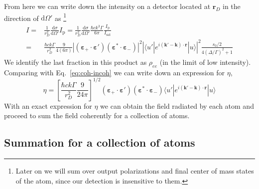 \documentclass[11pt,letter]{article}
\newcommand{\bv}[1]{\ensuremath{\bm{#1}}}
\begin{document}
From here we can write down the intensity on a detector located at $\bv{r}_{D}$
in the direction of $\mathrm{d} \Omega'$ as \footnote{Later on we will sum over
output polarizations and final center of mass states of the atom, since our
detection is insensitive to them.}
\begin{equation}
\begin{split}
I  =& \frac{1}{r_{D}^{2}} \frac{ \mathrm{d} \sigma } { \mathrm{d} \Omega'}
      I_{\mathrm{p}} 
   =  \frac{1}{r_{D}^{2}} \frac{ \mathrm{d} \sigma } { \mathrm{d} \Omega'}
      \frac{\hbar c k^{3}\Gamma}{6 \pi} 
      \frac{ I_{\mathrm{p}}}{I_{\mathrm{sat}}}  \\ 
   =& \frac{\hbar c k \Gamma}{r_{D}^{2}}  
    \frac{9}{4 (6\pi)} 
        |(\bv{\varepsilon}_{+}\cdot \bv{\varepsilon}' )
                       (\bv{\varepsilon}^{*}\cdot \bv{\varepsilon}_{-} ) |^{2}
    \left|
      \langle u' | e^{i(\bv{k}'-\bv{k}) \cdot\bv{r}} | u  \rangle
  \right| ^{2}
     \frac{ s_{0}/2   }
        { 4(\Delta/\Gamma)^{2} + 1 }
\end{split}
\end{equation}
We identify the last fraction in this product as $\rho_{ee}$ (in the limit of
low intensity). Comparing with Eq.~\ref{eq:coh-incoh} we can write down an
expression for $\eta$, 
\begin{equation}
  \eta = \left[ \frac{\hbar c k \Gamma}{r_{D}^{2}}  
    \frac{9}{24\pi} \right]^{1/2} 
        (\bv{\varepsilon}_{+}\cdot \bv{\varepsilon}' )
                       (\bv{\varepsilon}^{*}\cdot \bv{\varepsilon}_{-} ) 
      \langle u' | e^{i(\bv{k}'-\bv{k}) \cdot\bv{r}} | u  \rangle
\end{equation}
With an exact expression for $\eta$ we can obtain the field radiated by each
atom and proceed to sum the field coherently for a collection of atoms. 

\subsection{Summation for a collection of atoms} 
\end{document}
